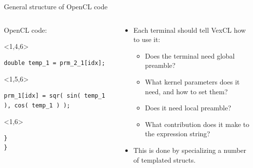 \documentclass[@BEAMER_OPTIONS@]{beamer}
\begin{document}
\begin{frame}[fragile,shrink=10]{General structure of OpenCL code}
\begin{columns}
\begin{column}{0.55\textwidth}
\begin{exampleblock}{OpenCL code:}
                \begin{uncoverenv}<1,4,6>
                    \begin{lstlisting}[firstnumber=last]
    double temp_1 = prm_2_1[idx];
                    \end{lstlisting}
                \end{uncoverenv}
                \begin{uncoverenv}<1,5,6>
                    \begin{lstlisting}[firstnumber=last]
    prm_1[idx] = sqr( sin( temp_1 ), cos( temp_1 ) );
                    \end{lstlisting}
                \end{uncoverenv}
                \begin{uncoverenv}<1,6>
                    \begin{lstlisting}[firstnumber=last]
  }
}
                    \end{lstlisting}
                \end{uncoverenv}
            \end{exampleblock}
        \end{column}
        \begin{column}{0.38\textwidth}
            \begin{itemize}
                \item Each terminal should tell VexCL how to use it:
                    \begin{itemize}
                        \item<alert@2> Does the terminal need global preamble?
                        \item<alert@3> What kernel parameters does it need, and
                            how to set them?
                        \item<alert@4> Does it need local preamble?
                        \item<alert@5> What contribution does it make to
                            the expression string?
                    \end{itemize}
                    \vspace{\baselineskip}
                \item<6> This is done by specializing a number of templated
                    structs.
            \end{itemize}
        \end{column}
    \end{columns}
\end{frame}
\end{document}
